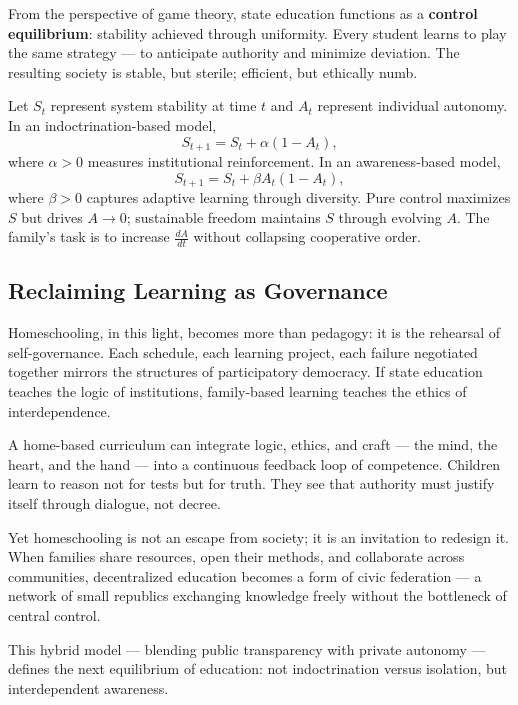 \documentclass[12pt,twoside]{book}
\begin{document}
From the perspective of game theory, state education functions as a \textbf{control equilibrium}: stability achieved through uniformity.  
Every student learns to play the same strategy — to anticipate authority and minimize deviation.  
The resulting society is stable, but sterile; efficient, but ethically numb.

\begin{tcolorbox}[colback=gray!5,colframe=gray!60,boxrule=0.4pt,arc=1mm,
title={Mathematical Interlude: Indoctrination vs. Autonomy Equilibrium},
enhanced,breakable,left=5pt,right=5pt]
\small
Let $S_t$ represent system stability at time $t$ and $A_t$ represent individual autonomy.  
In an indoctrination-based model,
\[
S_{t+1} = S_t + \alpha (1 - A_t),
\]
where $\alpha>0$ measures institutional reinforcement.  
In an awareness-based model,
\[
S_{t+1} = S_t + \beta A_t(1 - A_t),
\]
where $\beta>0$ captures adaptive learning through diversity.  
Pure control maximizes $S$ but drives $A\to 0$; sustainable freedom maintains $S$ through evolving $A$.  
The family’s task is to increase $\frac{dA}{dt}$ without collapsing cooperative order.
\end{tcolorbox}

\subsection*{Reclaiming Learning as Governance}

Homeschooling, in this light, becomes more than pedagogy: it is the rehearsal of self-governance.  
Each schedule, each learning project, each failure negotiated together mirrors the structures of participatory democracy.  
If state education teaches the logic of institutions, family-based learning teaches the ethics of interdependence.

A home-based curriculum can integrate logic, ethics, and craft — the mind, the heart, and the hand — into a continuous feedback loop of competence.  
Children learn to reason not for tests but for truth.  
They see that authority must justify itself through dialogue, not decree.

Yet homeschooling is not an escape from society; it is an invitation to redesign it.  
When families share resources, open their methods, and collaborate across communities, decentralized education becomes a form of civic federation — a network of small republics exchanging knowledge freely without the bottleneck of central control.

This hybrid model — blending public transparency with private autonomy — defines the next equilibrium of education: not indoctrination versus isolation, but interdependent awareness. \\
\end{document}
